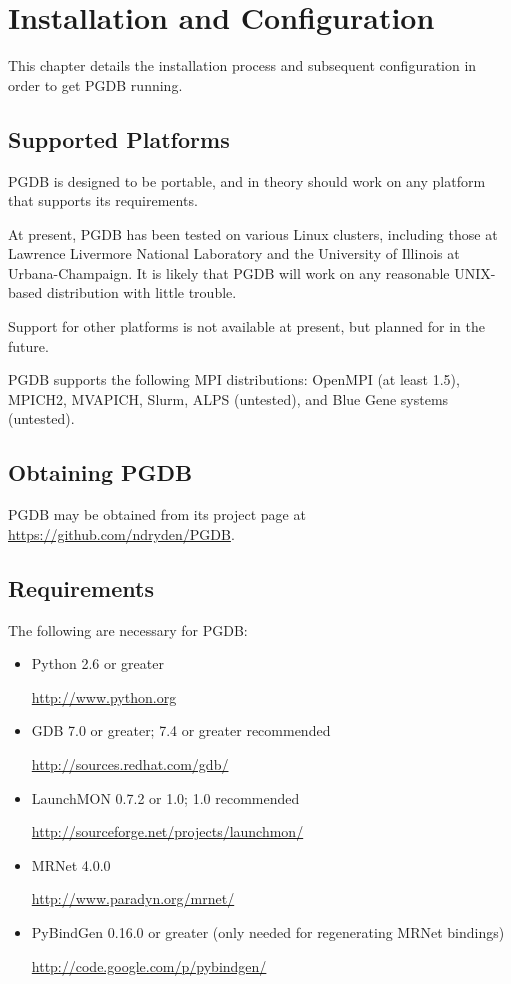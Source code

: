 \documentclass{refart}
\begin{document}
\newpage

\section{Installation and Configuration}

This chapter details the installation process and subsequent configuration in order to get PGDB running.

\subsection{Supported Platforms}

PGDB is designed to be portable, and in theory should work on any platform that supports its requirements.

At present, PGDB has been tested on various Linux clusters, including those at Lawrence Livermore National Laboratory and the University of Illinois at Urbana-Champaign. It is likely that PGDB will work on any reasonable UNIX-based distribution with little trouble.

Support for other platforms is not available at present, but planned for in the future.

PGDB supports the following MPI distributions: OpenMPI (at least 1.5), MPICH2, MVAPICH, Slurm, ALPS (untested), and Blue Gene systems (untested).

\subsection{Obtaining PGDB}

PGDB may be obtained from its project page at \url{https://github.com/ndryden/PGDB}.

\subsection{Requirements}

The following are necessary for PGDB:

\begin{itemize}
\item Python 2.6 or greater

  \url{http://www.python.org}
\item GDB 7.0 or greater; 7.4 or greater recommended

  \url{http://sources.redhat.com/gdb/}
\item LaunchMON 0.7.2 or 1.0; 1.0 recommended

  \url{http://sourceforge.net/projects/launchmon/}
\item MRNet 4.0.0

  \url{http://www.paradyn.org/mrnet/}
\item PyBindGen 0.16.0 or greater (only needed for regenerating MRNet bindings)

  \url{http://code.google.com/p/pybindgen/}
\end{itemize}
\end{document}
